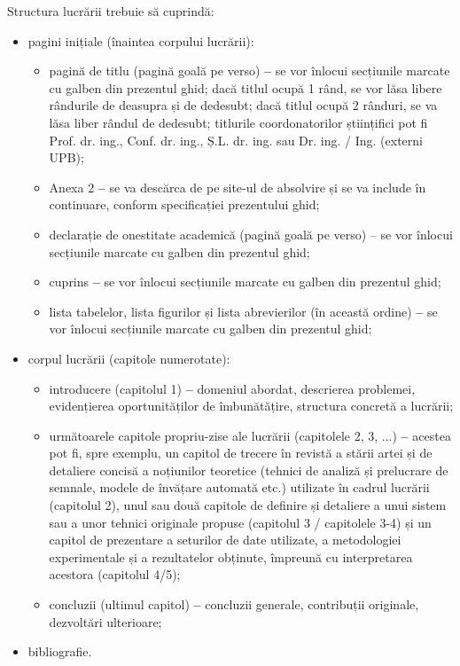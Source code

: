 Structura lucrării trebuie să cuprindă:
\begin{itemize}
    \item pagini inițiale (înaintea corpului lucrării):
    \begin{itemize}
        \item pagină de titlu (pagină goală pe verso) \textbf{--} se vor înlocui secțiunile marcate cu galben din prezentul ghid; dacă titlul ocupă 1 rând, se vor lăsa libere rândurile de deasupra și de dedesubt; dacă titlul ocupă 2 rânduri, se va lăsa liber rândul de dedesubt; titlurile coordonatorilor științifici pot fi Prof. dr. ing., Conf. dr. ing., Ș.L. dr. ing. sau Dr. ing. / Ing. (externi UPB);
	\item Anexa 2 \textbf{--} se va descărca de pe site-ul de absolvire și se va include în continuare, conform specificației prezentului ghid;
	\item declarație de onestitate academică (pagină goală pe verso) – se vor înlocui secțiunile marcate cu galben din prezentul ghid;
	\item cuprins \textbf{--} se vor înlocui secțiunile marcate cu galben din prezentul ghid;
	\item lista tabelelor, lista figurilor și lista abrevierilor (în această ordine) \textbf{--} se vor înlocui secțiunile marcate cu galben din prezentul ghid;
    \end{itemize}
    \item corpul lucrării (capitole numerotate):
	\begin{itemize}
	    \item introducere (capitolul 1) \textbf{--} domeniul abordat, descrierea problemei, evidențierea oportunităților de îmbunătățire, structura concretă a lucrării;
	\item următoarele capitole propriu-zise ale lucrării (capitolele 2, 3, ...) \textbf{--} acestea pot fi, spre exemplu, un capitol de trecere în revistă a stării artei și de detaliere concisă a noțiunilor teoretice (tehnici de analiză și prelucrare de semnale, modele de învățare automată etc.) utilizate în cadrul lucrării (capitolul 2), unul sau două capitole de definire și detaliere a unui sistem sau a unor tehnici originale propuse (capitolul 3 / capitolele 3-4) și un capitol de prezentare a seturilor de date utilizate, a metodologiei experimentale și a rezultatelor obținute, împreună cu interpretarea acestora (capitolul 4/5);
	\item concluzii (ultimul capitol) \textbf{--} concluzii generale, contribuții originale, dezvoltări ulterioare;
    \end{itemize}
    \item bibliografie.\\
\end{itemize}

